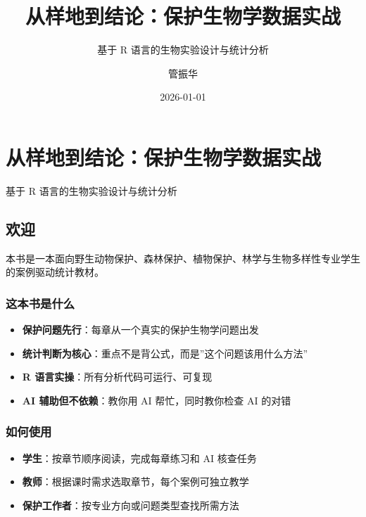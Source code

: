 \documentclass[
  letterpaper,
]{scrbook}
\title{从样地到结论：保护生物学数据实战}
\subtitle{基于 R 语言的生物实验设计与统计分析}
\author{管振华}
\date{2026-01-01}
\providecommand{\tightlist}{%
  \setlength{\itemsep}{0pt}\setlength{\parskip}{0pt}}
\renewcommand*\contentsname{Table of contents}
\newcommand\contentsname{Table of contents}
\begin{document}
\frontmatter
\maketitle

\renewcommand*\contentsname{Table of contents}
{
\setcounter{tocdepth}{2}
\tableofcontents
}

\mainmatter
{}

\chapter{从样地到结论：保护生物学数据实战}\label{ux4eceux6837ux5730ux5230ux7ed3ux8bbaux4fddux62a4ux751fux7269ux5b66ux6570ux636eux5b9eux6218}

基于 R 语言的生物实验设计与统计分析

\hfill\break

\section{欢迎}\label{ux6b22ux8fce}

本书是一本面向野生动物保护、森林保护、植物保护、林学与生物多样性专业学生的案例驱动统计教材。

\subsection{这本书是什么}\label{ux8fd9ux672cux4e66ux662fux4ec0ux4e48}

\begin{itemize}
\tightlist
\item
  \textbf{保护问题先行}：每章从一个真实的保护生物学问题出发
\item
  \textbf{统计判断为核心}：重点不是背公式，而是''这个问题该用什么方法''
\item
  \textbf{R 语言实操}：所有分析代码可运行、可复现
\item
  \textbf{AI 辅助但不依赖}：教你用 AI 帮忙，同时教你检查 AI 的对错
\end{itemize}

\subsection{如何使用}\label{ux5982ux4f55ux4f7fux7528}

\begin{itemize}
\tightlist
\item
  \textbf{学生}：按章节顺序阅读，完成每章练习和 AI 核查任务
\item
  \textbf{教师}：根据课时需求选取章节，每个案例可独立教学
\item
  \textbf{保护工作者}：按专业方向或问题类型查找所需方法
\end{itemize}
\end{document}
